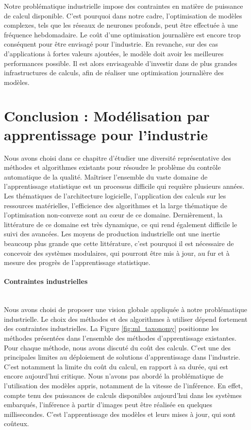 Notre problématique industrielle impose des contraintes en matière de puissance de calcul disponible.
C'est pourquoi dans notre cadre, l'optimisation de modèles complexes, tels que les réseaux de neurones profonds, peut être effectuée à une fréquence hebdomadaire.
Le coût d'une optimisation journalière est encore trop conséquent pour être envisagé pour l'industrie.
En revanche, sur des cas d'applications à fortes valeurs ajoutées, le modèle doit avoir les meilleures performances possible.
Il est alors envisageable d'investir dans de plus grandes infrastructures de calculs, afin de réaliser une optimisation journalière des modèles.


\section{Conclusion : Modélisation par apprentissage pour l'industrie} \label{subsec:metric_learning_conclusion}
Nous avons choisi dans ce chapitre d'étudier une diversité représentative des méthodes et algorithmes existants pour résoudre le problème du contrôle automatique de la qualité.
Maîtriser l'ensemble du vaste domaine de l'apprentissage statistique est un processus difficile qui requière plusieurs années.
Les thématiques de l'architecture logicielle, l'application des calculs sur les ressources matérielles, l'efficience des algorithmes et la large thématique de l'optimisation non-convexe sont au cœur de ce domaine.
Dernièrement, la littérature de ce domaine est très dynamique, ce qui rend également difficile le suivi des avancées.
Les moyens de production industrielle ont une inertie beaucoup plus grande que cette littérature, c'est pourquoi il est nécessaire de concevoir des systèmes modulaires, qui pourront être mis à jour, au fur et à mesure des progrès de l'apprentissage statistique.

\paragraph{Contraintes industrielles} \mbox{} \\
Nous avons choisi de proposer une vision globale appliquée à notre problématique industrielle.
Le choix des méthodes et des algorithmes à utiliser dépend fortement des contraintes industrielles.
La Figure \ref{fig:ml_taxonomy} positionne les méthodes présentées dans l'ensemble des méthodes d'apprentissage existantes.
Pour chaque méthode, nous avons discuté du coût des calculs.
C'est une des principales limites au déploiement de solutions d'apprentissage dans l'industrie.
C'est notamment la limite du coût du calcul, en rapport à sa durée, qui est encore aujourd'hui critique.
Nous n'avons pas abordé la problématique de l'utilisation des modèles appris, notamment de la vitesse de l'inférence.
En effet, compte tenu des puissances de calculs disponibles aujourd'hui dans les systèmes embarqués, l'inférence à partir d'images peut être réalisée en quelques millisecondes.
C'est l'apprentissage des modèles et leurs mises à jour, qui sont coûteux.

